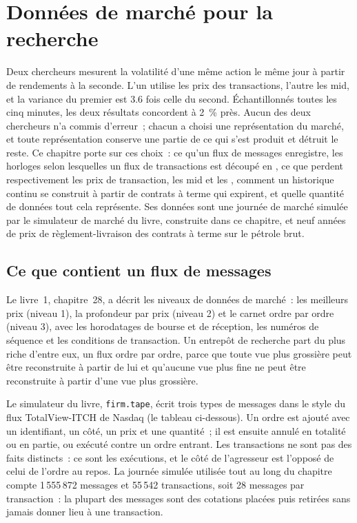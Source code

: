 \chapter{Données de marché pour la recherche}\label{ch:rs:market-data-for-research}

Deux chercheurs mesurent la volatilité d'une même action le même jour à partir de rendements à la seconde. L'un utilise les prix des transactions,
l'autre les mid, et la variance du premier est 3.6 fois celle du second. Échantillonnés toutes les cinq minutes, les deux résultats concordent à 2~\% près.
Aucun des deux chercheurs n'a commis d'erreur~; chacun a choisi une représentation du marché, et toute représentation conserve une partie de ce qui
s'est produit et détruit le reste. Ce chapitre porte sur ces choix~: ce qu'un flux de messages enregistre, les horloges selon lesquelles un
flux de transactions est découpé en , ce que perdent respectivement les prix de transaction, les mid et les , comment un historique continu se construit à partir
de contrats à terme qui expirent, et quelle quantité de données tout cela représente. Ses données sont une journée de marché simulée par le simulateur de marché du livre,
construite dans ce chapitre, et neuf années de prix de règlement-livraison des contrats à terme sur le pétrole brut.

\section{Ce que contient un flux de messages}

Le livre~1, chapitre~28, a décrit les niveaux de données de marché~: les meilleurs prix (niveau 1), la profondeur par prix (niveau 2)
et le carnet ordre par ordre (niveau 3), avec les horodatages de bourse et de réception, les numéros de séquence et les conditions de transaction. Un entrepôt de recherche
part du plus riche d'entre eux, un flux ordre par ordre, parce que toute vue plus grossière peut être reconstruite à partir de lui et qu'aucune vue plus fine
ne peut être reconstruite à partir d'une vue plus grossière.

Le simulateur du livre, \texttt{firm.tape}, écrit trois types de messages dans le style du flux TotalView-ITCH de Nasdaq (le tableau
ci-dessous). Un ordre est ajouté avec un identifiant, un côté, un prix et une quantité~; il est ensuite annulé en totalité ou en partie, ou exécuté
contre un ordre entrant. Les transactions ne sont pas des faits distincts~: ce sont les exécutions, et le côté de l'agresseur est l'opposé de
celui de l'ordre au repos. La journée simulée utilisée tout au long du chapitre compte 1\,555\,872 messages et 55\,542 transactions, soit 28 messages par
transaction~: la plupart des messages sont des cotations placées puis retirées sans jamais donner lieu à une transaction.

